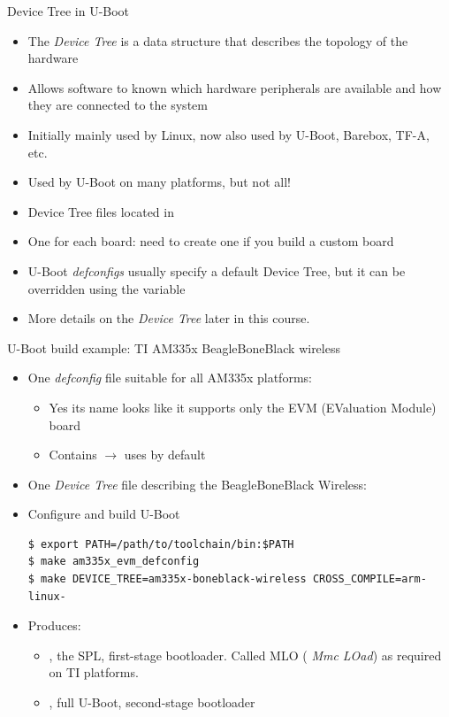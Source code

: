 \begin{frame}{Device Tree in U-Boot}
  \begin{itemize}
  \item The {\em Device Tree} is a data structure that describes the
    topology of the hardware
  \item Allows software to known which hardware peripherals are
    available and how they are connected to the system
  \item Initially mainly used by Linux, now also used by U-Boot,
    Barebox, TF-A, etc.
  \item Used by U-Boot on many platforms, but not all!
  \item Device Tree files located in 
  \item One  for each board: need to create one if you
    build a custom board
  \item U-Boot {\em defconfigs} usually specify a default Device Tree,
    but it can be overridden using the  variable
  \item More details on the {\em Device Tree} later in this course.
  \end{itemize}
\end{frame}

\begin{frame}[fragile]{U-Boot build example: TI AM335x BeagleBoneBlack wireless}
  \begin{itemize}
  \item One {\em defconfig} file suitable for all AM335x platforms:
    \begin{itemize}
    \item Yes its name looks like it supports only the EVM (EValuation
      Module) board
    \item Contains 
      $\rightarrow$ uses
       by default
    \end{itemize}
  \item One {\em Device Tree} file describing the BeagleBoneBlack
    Wireless:
  \item Configure and build U-Boot
\begin{verbatim}
$ export PATH=/path/to/toolchain/bin:$PATH
$ make am335x_evm_defconfig
$ make DEVICE_TREE=am335x-boneblack-wireless CROSS_COMPILE=arm-linux-
\end{verbatim}
  \item Produces:
    \begin{itemize}
    \item {}, the SPL, first-stage bootloader. Called MLO ({\em
    Mmc LOad}) as required on TI platforms.
    \item {}, full U-Boot, second-stage bootloader
    \end{itemize}
  \end{itemize}
\end{frame}

